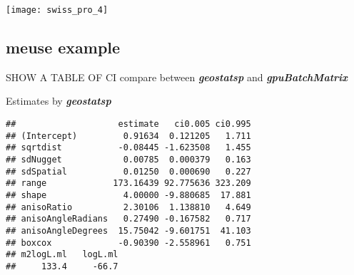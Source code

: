 \documentclass{article}\usepackage[]{graphicx}\usepackage[]{color}
\makeatletter
\newenvironment{kframe}{%
 \def\at@end@of@kframe{}%
 \ifinner\ifhmode%
  \def\at@end@of@kframe{\end{minipage}}%
  \begin{minipage}{\columnwidth}%
 \fi\fi%
 \def\FrameCommand##1{\hskip\@totalleftmargin \hskip-\fboxsep
 \colorbox{shadecolor}{##1}\hskip-\fboxsep
     \hskip-\linewidth \hskip-\@totalleftmargin \hskip\columnwidth}%
 \MakeFramed {\advance\hsize-\width
   \@totalleftmargin\z@ \linewidth\hsize
   \@setminipage}}%
 {\par\unskip\endMakeFramed%
 \at@end@of@kframe}
\newenvironment{knitrout}{}{} %
\newcommand{\pkg}[1]{\textbf{\emph{#1}}}
\makeatother
\begin{document}
\begin{knitrout}
\color{fgcolor}

{\centering \texttt{[image: swiss\_pro\_4]} 

}


\end{knitrout}






\subsection{meuse example}


SHOW A TABLE OF CI compare between \pkg{geostatsp} and \pkg{gpuBatchMatrix}



Estimates by \pkg{geostatsp}
\begin{knitrout}
\color{fgcolor}\begin{kframe}
\begin{verbatim}
##                    estimate   ci0.005 ci0.995
## (Intercept)         0.91634  0.121205   1.711
## sqrtdist           -0.08445 -1.623508   1.455
## sdNugget            0.00785  0.000379   0.163
## sdSpatial           0.01250  0.000690   0.227
## range             173.16439 92.775636 323.209
## shape               4.00000 -9.880685  17.881
## anisoRatio          2.30106  1.138810   4.649
## anisoAngleRadians   0.27490 -0.167582   0.717
## anisoAngleDegrees  15.75042 -9.601751  41.103
## boxcox             -0.90390 -2.558961   0.751
## m2logL.ml   logL.ml 
##     133.4     -66.7
\end{verbatim}
\end{kframe}
\end{knitrout}
\end{document}
